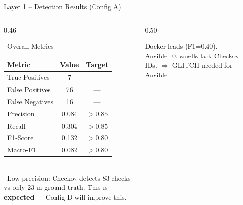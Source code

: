 \documentclass[aspectratio=169, 10pt]{beamer}
\begin{document}
\begin{frame}{Layer 1 -- Detection Results (Config A)}
  \begin{columns}[T]
    \begin{column}{0.46\textwidth}
      \begin{block}{\faTable\ Overall Metrics}
        {\scriptsize
        \begin{tabular}{@{}lcc@{}}
          \toprule
          Metric & Value & Target\\
          \midrule
          True Positives & 7 & ---\\
          False Positives & 76 & ---\\
          False Negatives & 16 & ---\\
          \midrule
          Precision & 0.084 & $>0.85$\\
          Recall & 0.304 & $>0.85$\\
          F1-Score & 0.132 & $>0.80$\\
          Macro-F1 & 0.082 & $>0.80$\\
          \bottomrule
        \end{tabular}}\\[0.3em]
        {\tiny\color{accentred}
        \faBug\ Low precision: Checkov detects 83 checks
        vs only 23 in ground truth.
        This is \textbf{expected} --- Config D will improve this.}
      \end{block}
    \end{column}
    \begin{column}{0.50\textwidth}
      {\tiny\color{sfaxblue}
      Docker leads (F1=0.40). Ansible=0: smells lack Checkov IDs.
      $\Rightarrow$ GLITCH needed for Ansible.}
    \end{column}
  \end{columns}
\end{frame}
\end{document}
